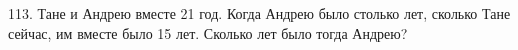 113. Тане и Андрею вместе 21 год. Когда Андрею было столько лет, сколько Тане сейчас, им вместе было 15 лет. Сколько лет было тогда Андрею?\\
